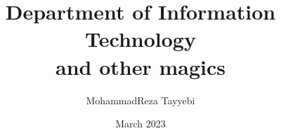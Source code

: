 \documentclass[a4paper,12pt]{book}
\begin{document}
\author{MohammadReza Tayyebi}
\title{Department of Information Technology\\and other magics}
\date{March 2023}

\frontmatter
\maketitle
\tableofcontents

\mainmatter




\backmatter
\end{document}
